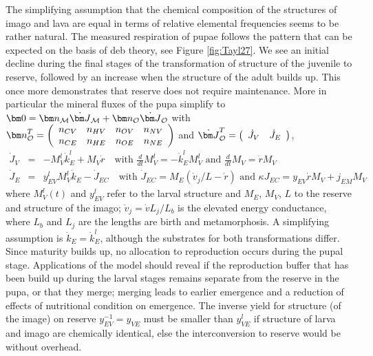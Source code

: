 The simplifying assumption that the chemical composition of the structures of imago and lava are equal in terms of relative elemental frequencies seems to be rather natural.
The measured respiration of pupae follows the pattern that can be expected on the basis of {\sc deb} theory, see Figure \ref{fig:Tayl27}.
We see an initial decline during the final stages of the transformation of structure of the juvenile to reserve, followed by an increase when the structure of the adult builds up.
This once more demonstrates that reserve does not require maintenance.
More in particular the mineral fluxes of the pupa simplify to 
${\bm 0} = {\bm n}_{\cal M} \dot{\bm J}_{\cal M} + {\bm n}_{\cal O} \dot{\bm J}_{\cal O}$ with
${\bm n}_{\cal O}^T = \left( \begin{array}{cccc} n_{CV} & n_{HV} & n_{OV} & n_{NV} \\ n_{CE} & n_{HE} & n_{OE} & n_{NE} \end{array} \right)$ and
$\dot{\bm J}_{\cal O}^T = \left( \begin{array}{cc} \dot{J}_V & \dot{J}_E \end{array} \right)$, 
\begin{eqnarray*}
  \dot{J}_V &=& - M_V^l \dot{k}_E^l + M_V \dot{r} \quad 
  \mbox{with } \frac{d} {dt} M_V^l = - \dot{k}_E^l M_V^l
  \mbox{ and } \frac{d} {dt} M_V = \dot{r} M_V
  \\
  \dot{J}_E &=& y_{EV}^l M_V^l \dot{k}_E  - \dot{J}_{EC} \quad 
  \mbox{with } \dot{J}_{EC} = M_E (\dot{v}_j/ L - \dot{r}) 
  \mbox{ and } \kappa {J}_{EC} = y_{EV} \dot{r} M_V + j_{EM} M_V
\end{eqnarray*}
where $M_V^l(t)$ and $y_{EV}^l$ refer to the larval structure and $M_E$, $M_V$, $L$ to the reserve and structure of the imago;
$\dot{v}_j = \dot{v} L_j/ L_b$ is the elevated energy conductance, where $L_b$ and $L_j$ are the lengths are birth and metamorphosis.
A simplifying assumption is $\dot{k}_E = \dot{k}_E^l$, although the substrates for both transformations differ.
Since maturity builds up, no allocation to reproduction occurs during the pupal stage.
Applications of the model should reveal if the reproduction buffer that has been build up during the larval stages remains separate from the reserve in the pupa, or that they merge;
merging leads to earlier emergence and a reduction of effects of nutritional condition on emergence.
The inverse yield for structure (of the image) on reserve  $y_{EV}^{-1} = y_{VE}$ must be smaller than  $y_{VE}^l$ if structure of larva and imago are chemically identical, else the interconversion to reserve would be without overhead.

